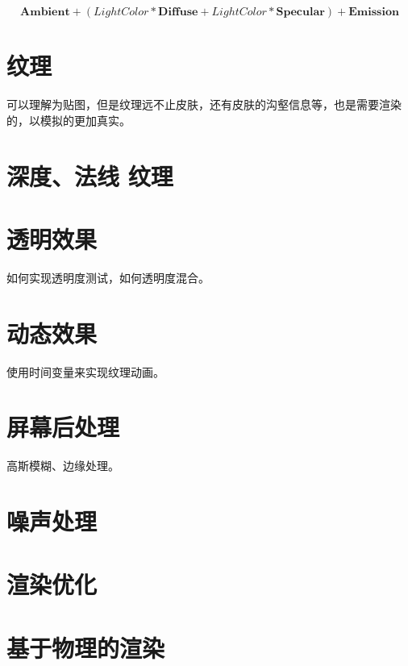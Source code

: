\documentclass[UTF8,a4paper,12pt]{ctexbook}
\begin{document}
	$$\mathbf{Ambient} + (Light Color * \mathbf{Diffuse} + Light  Color* \mathbf{Specular}) + \mathbf{Emission}$$

\chapter{纹理}
	可以理解为贴图，但是纹理远不止皮肤，还有皮肤的沟壑信息等，也是需要渲染的，以模拟的更加真实。

\chapter{深度、法线 纹理}
	


\chapter{透明效果}
	如何实现透明度测试，如何透明度混合。


\chapter{动态效果}
	使用时间变量来实现纹理动画。


\chapter{屏幕后处理}
	高斯模糊、边缘处理。



\chapter{噪声处理}



\chapter{渲染优化}



\chapter{基于物理的渲染}
\end{document}
